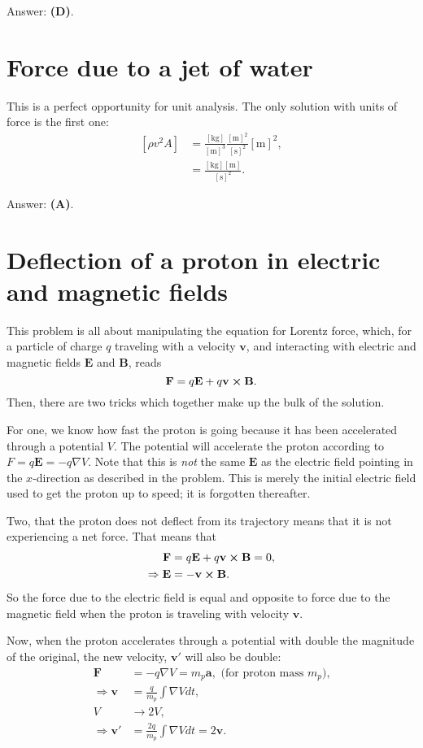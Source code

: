 \documentclass[11pt]{paper}
\newcommand{\answer}[1]{Answer: \textbf{(#1)}.}
\newcommand{\units}[1]{\left[\text{#1}\right]}
\begin{document}
\answer{D}


\section{Force due to a jet of water}
This is a perfect opportunity for unit analysis.  The only solution with units of force is the first one:
\begin{align}
\left[\rho v^2 A\right] &= \frac{\units{kg}}{\units{m}^3} \frac{\units{m}^2}{\units{s}^2}\units{m}^2,\\
&= \frac{\units{kg}\units{m}}{\units{s}^2}.
\end{align}

\answer{A}

\section{Deflection of a proton in electric and magnetic fields}
This problem is all about manipulating the equation for Lorentz force, which, for a particle of charge $q$ traveling with a velocity $\mathbf{v}$, and interacting with electric and magnetic fields $\mathbf{E}$ and $\mathbf{B}$, reads
\begin{equation}
\mathbf{F} = q\mathbf{E}+q\mathbf{v} \cross \mathbf{B}.
\end{equation}
Then, there are two tricks which together make up the bulk of the solution.

For one, we know how fast the proton is going because it has been accelerated through a potential $V$.  The potential will accelerate the proton according to $F = q\mathbf{E} = -q\nabla V$.  Note that this is \emph{not} the same $\mathbf{E}$ as the electric field pointing in the $x$-direction as described in the problem.  This is merely the initial electric field used to get the proton up to speed; it is forgotten thereafter.

Two, that the proton does not deflect from its trajectory means that it is not experiencing a net force.  That means that
\begin{align}
\mathbf{F} &= q\mathbf{E}+q\mathbf{v} \cross \mathbf{B} = 0,\\
\Rightarrow \mathbf{E} &= -\mathbf{v} \cross \mathbf{B}.
\end{align}
So the force due to the electric field is equal and opposite to force due to the magnetic field when the proton is traveling with velocity $\mathbf{v}$.

Now, when the proton accelerates through a potential with double the magnitude of the original, the new velocity, $\mathbf{v}'$ will also be double:
\begin{align}
\mathbf{F} &= -q\nabla V = m_p\mathbf{a},  \text{ (for proton mass $m_p$),}\\
\Rightarrow \mathbf{v} &= \frac{q}{m_p} \int \nabla V dt,\\
V &\rightarrow 2V,\\
\Rightarrow \mathbf{v}' &= \frac{2q}{m_p} \int \nabla V dt = 2\mathbf{v}.
\end{align}
\end{document}

